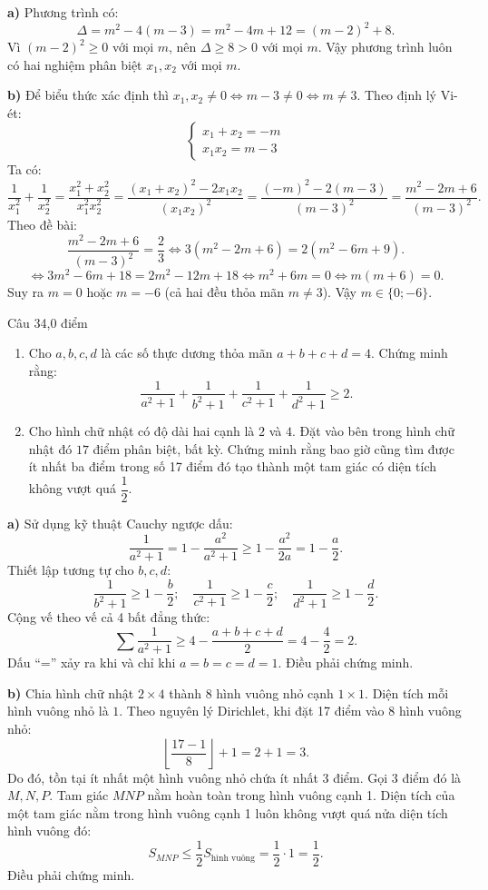 \begin{loi_giai_cau}
\textbf{a)} Phương trình có:
\[\Delta = m^2 - 4(m-3) = m^2 - 4m + 12 = (m-2)^2 + 8.\]
Vì $(m-2)^2 \ge 0$ với mọi $m$, nên $\Delta \ge 8 > 0$ với mọi $m$.
Vậy phương trình luôn có hai nghiệm phân biệt $x_1, x_2$ với mọi $m$.

\textbf{b)} Để biểu thức xác định thì $x_1, x_2 \neq 0 \iff m - 3 \neq 0 \iff m \neq 3$.
Theo định lý Vi-ét:
\[\begin{cases} x_1 + x_2 = -m \\ x_1 x_2 = m - 3 \end{cases}\]
Ta có:
\[\frac{1}{x_1^2} + \frac{1}{x_2^2} = \frac{x_1^2 + x_2^2}{x_1^2 x_2^2} = \frac{(x_1+x_2)^2 - 2x_1 x_2}{(x_1 x_2)^2} = \frac{(-m)^2 - 2(m-3)}{(m-3)^2} = \frac{m^2 - 2m + 6}{(m-3)^2}.\]
Theo đề bài:
\[\frac{m^2 - 2m + 6}{(m-3)^2} = \frac{2}{3} \iff 3(m^2 - 2m + 6) = 2(m^2 - 6m + 9).\]
\[\iff 3m^2 - 6m + 18 = 2m^2 - 12m + 18 \iff m^2 + 6m = 0 \iff m(m+6) = 0.\]
Suy ra $m = 0$ hoặc $m = -6$ (cả hai đều thỏa mãn $m \neq 3$).
Vậy $\boxed{m \in \{0; -6\}}$.
\end{loi_giai_cau}

\begin{de_cau}{Câu 3}{4,0 điểm}
\begin{enumerate}[label=\alph*)]
\item Cho $a, b, c, d$ là các số thực dương thỏa mãn $a+b+c+d = 4$. Chứng minh rằng:
\[\dfrac{1}{a^2+1} + \dfrac{1}{b^2+1} + \dfrac{1}{c^2+1} + \dfrac{1}{d^2+1} \ge 2.\]
\item Cho hình chữ nhật có độ dài hai cạnh là $2$ và $4$. Đặt vào bên trong hình chữ nhật đó $17$ điểm phân biệt, bất kỳ. Chứng minh rằng bao giờ cũng tìm được ít nhất ba điểm trong số 17 điểm đó tạo thành một tam giác có diện tích không vượt quá $\dfrac{1}{2}$.
\end{enumerate}
\end{de_cau}

\begin{loi_giai_cau}
\textbf{a)} Sử dụng kỹ thuật Cauchy ngược dấu:
\[\frac{1}{a^2+1} = 1 - \frac{a^2}{a^2+1} \ge 1 - \frac{a^2}{2a} = 1 - \frac{a}{2}.\]
Thiết lập tương tự cho $b, c, d$:
\[\frac{1}{b^2+1} \ge 1 - \frac{b}{2};\quad \frac{1}{c^2+1} \ge 1 - \frac{c}{2};\quad \frac{1}{d^2+1} \ge 1 - \frac{d}{2}.\]
Cộng vế theo vế cả 4 bất đẳng thức:
\[\sum \frac{1}{a^2+1} \ge 4 - \frac{a+b+c+d}{2} = 4 - \frac{4}{2} = \boxed{2}.\]
Dấu ``='' xảy ra khi và chỉ khi $a = b = c = d = 1$. Điều phải chứng minh.

\textbf{b)} Chia hình chữ nhật $2 \times 4$ thành 8 hình vuông nhỏ cạnh $1 \times 1$.
Diện tích mỗi hình vuông nhỏ là $1$.
Theo nguyên lý Dirichlet, khi đặt 17 điểm vào 8 hình vuông nhỏ:
\[\left\lfloor \frac{17-1}{8} \right\rfloor + 1 = 2 + 1 = 3.\]
Do đó, tồn tại ít nhất một hình vuông nhỏ chứa ít nhất 3 điểm.
Gọi 3 điểm đó là $M, N, P$. Tam giác $MNP$ nằm hoàn toàn trong hình vuông cạnh 1.
Diện tích của một tam giác nằm trong hình vuông cạnh 1 luôn không vượt quá nửa diện tích hình vuông đó:
\[S_{MNP} \le \frac{1}{2} S_{\text{hình vuông}} = \frac{1}{2} \cdot 1 = \boxed{\frac{1}{2}}.\]
Điều phải chứng minh.
\end{loi_giai_cau}

